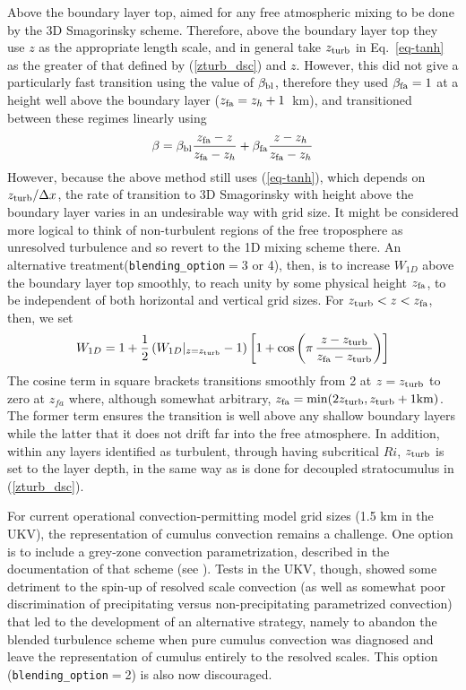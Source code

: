 \documentclass{UMDP_article}
\begin{document}
Above the boundary layer top, \cite{Boutleetal2014} aimed for any free 
atmospheric mixing to be done by the 3D Smagorinsky scheme. Therefore, above
the boundary layer top they use $z$ as the appropriate length scale, and in 
general take $z_{\rm turb}$ in Eq.~\ref{eq-tanh} as the greater of that defined 
by (\ref{zturb_dsc}) and $z$. However, this did not give a particularly 
fast transition using the value of $\beta_{\rm  bl}$, therefore they used 
$\beta_{\rm fa}=1$ at a height well above the boundary layer 
($z_{\rm fa}=z_h+1$~km), and transitioned between these regimes linearly using
\begin{equation}
  \beta = \beta_{\rm bl}\frac{z_{\rm fa}-z}{z_{\rm fa}-z_h} + 
          \beta_{\rm fa}\frac{z-z_h}{z_{\rm fa}-z_h}
\end{equation}
However, because the above method still uses (\ref{eq-tanh}), which depends on 
$z_{\rm turb}/\Delta x$, the rate of transition to 3D Smagorinsky with height 
above the boundary layer varies in an undesirable way with grid size.  It 
might be considered more logical to think of non-turbulent regions of the free 
troposphere as unresolved turbulence and so revert to the 1D mixing scheme 
there.  An alternative treatment({\tt blending\_option}$=$3 or 4), then, is to 
increase $W_{1D}$ above the boundary layer top smoothly, to reach unity by 
some physical height $z_{\rm fa}$, to be independent of both horizontal and 
vertical grid sizes.  For $z_{\rm turb} < z < z_{\rm fa}$, then, we set
\begin{equation}
  W_{1D} = 1 + \frac{1}{2} \left( W_{1D}|_{z=z_{\rm turb}} - 1 \right)
    \left[ 1 + {\rm cos}\left( \pi \, \frac{z-z_{\rm turb}}{z_{\rm fa}-z_{\rm turb}}
                     \right) \right]
\end{equation}
The cosine term in square brackets transitions smoothly from 2 at 
$z=z_{\rm turb}$ to zero at $z_{fa}$ where, although somewhat 
arbitrary, $z_{\rm fa} = {\rm min}(2 z_{\rm turb}, z_{\rm turb}+1 {\rm km})$.  
The former term ensures the transition is well above any shallow boundary 
layers while the latter that it does not drift far into the free atmosphere.  
In addition, within any layers identified as turbulent, through having 
subcritical $Ri$, $z_{\rm turb}$ is set to the layer depth, in the same way 
as is done for decoupled stratocumulus in (\ref{zturb_dsc}).

For current operational convection-permitting model grid sizes (1.5 km
in the UKV), the representation of cumulus convection remains a
challenge.  One option is to include a grey-zone convection
parametrization, described in the documentation of that scheme 
(see ).  Tests in the UKV, though, showed some
detriment to the spin-up of resolved scale convection (as well as
somewhat poor discrimination of precipitating versus non-precipitating
parametrized convection) that led to the development of an alternative
strategy, namely to abandon the blended turbulence scheme when pure
cumulus convection was diagnosed and leave the representation of
cumulus entirely to the resolved scales.  This option 
({\tt blending\_option}$=$2) is also now discouraged.
\end{document}
